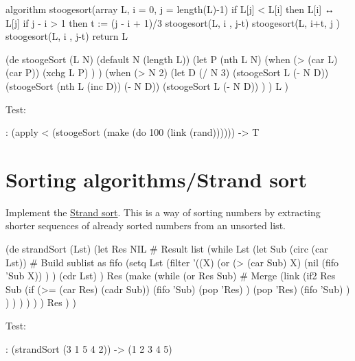 \begin{itemize}
\begin{wideverbatim}
algorithm stoogesort(array L, i = 0, j = length(L)-1)
     if L[j] < L[i] then
         L[i] ↔ L[j]
     if j - i > 1 then
         t := (j - i + 1)/3
         stoogesort(L, i  , j-t)
         stoogesort(L, i+t, j  )
         stoogesort(L, i  , j-t)
     return L
\end{wideverbatim}



\begin{wideverbatim}

(de stoogeSort (L N)
   (default N (length L))
   (let P (nth L N)
      (when (> (car L) (car P))
         (xchg L P) ) )
   (when (> N 2)
      (let D (/ N 3)
         (stoogeSort L (- N D))
         (stoogeSort (nth L (inc D)) (- N D))
         (stoogeSort L (- N D)) ) )
   L )

Test:

: (apply < (stoogeSort (make (do 100 (link (rand))))))
-> T

\end{wideverbatim}

\pagebreak{}
\section*{Sorting algorithms/Strand sort}

Implement the \href{http://en.wikipedia.org/wiki/Strand\_sort}{Strand
sort}. This is a way of sorting numbers by extracting shorter sequences
of already sorted numbers from an unsorted list.

\begin{wideverbatim}

(de strandSort (Lst)
   (let Res NIL  # Result list
      (while Lst
         (let Sub (circ (car Lst))  # Build sublist as fifo
            (setq
               Lst (filter
                  '((X)
                     (or
                        (> (car Sub) X)
                        (nil (fifo 'Sub X)) ) )
                  (cdr Lst) )
               Res (make
                  (while (or Res Sub)  # Merge
                     (link
                        (if2 Res Sub
                           (if (>= (car Res) (cadr Sub))
                              (fifo 'Sub)
                              (pop 'Res) )
                           (pop 'Res)
                           (fifo 'Sub) ) ) ) ) ) ) )
      Res ) )

Test:

: (strandSort (3 1 5 4 2))
-> (1 2 3 4 5)


\end{wideverbatim}
\end{itemize}
